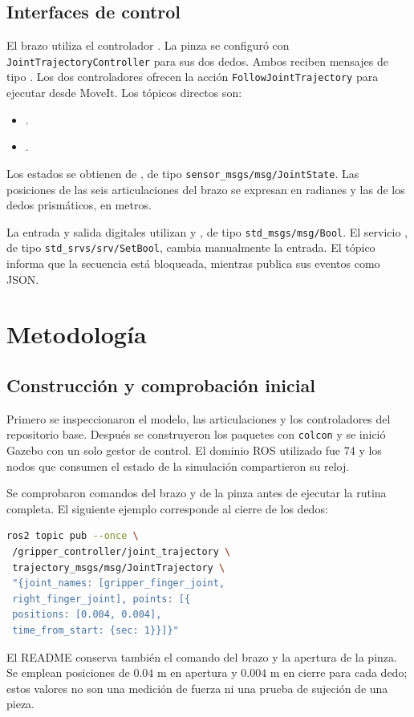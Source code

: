 \documentclass[conference]{IEEEtran}
\begin{document}
\subsection{Interfaces de control}
El brazo utiliza el controlador
. La pinza se configuró con
\texttt{JointTrajectoryController} para sus dos dedos. Ambos reciben mensajes de tipo
.
Los dos controladores ofrecen la acción
\texttt{FollowJointTrajectory} para ejecutar desde MoveIt.
Los tópicos directos son:
\begin{itemize}
\item {}.
\item {}.
\end{itemize}
Los estados se obtienen de , de tipo
\texttt{sensor\_msgs/msg/JointState}. Las posiciones de las seis
articulaciones del brazo se expresan en radianes y las de los dedos
prismáticos, en metros.

La entrada y salida digitales utilizan
 y , de tipo
\texttt{std\_msgs/msg/Bool}. El servicio
, de tipo
\texttt{std\_srvs/srv/SetBool}, cambia manualmente la entrada.
El tópico  informa que la secuencia está
bloqueada, mientras  publica sus eventos como JSON.

\section{Metodología}
\subsection{Construcción y comprobación inicial}
Primero se inspeccionaron el modelo, las articulaciones y los
controladores del repositorio base. Después se construyeron los paquetes
con \texttt{colcon} y se inició Gazebo con un solo gestor de control.
El dominio ROS utilizado fue 74 y los nodos que consumen el estado de
la simulación compartieron su reloj.

Se comprobaron comandos del brazo y de la pinza antes de ejecutar la
rutina completa. El siguiente ejemplo corresponde al cierre de los dedos:
\begin{lstlisting}[language=bash,caption={Comando directo de cierre de la pinza.}]
ros2 topic pub --once \
 /gripper_controller/joint_trajectory \
 trajectory_msgs/msg/JointTrajectory \
 "{joint_names: [gripper_finger_joint,
 right_finger_joint], points: [{
 positions: [0.004, 0.004],
 time_from_start: {sec: 1}}]}"
\end{lstlisting}
El README conserva también el comando del brazo y la apertura de la
pinza. Se emplean posiciones de $0.04$ m en apertura y $0.004$ m
en cierre para cada dedo; estos valores no son una medición de fuerza
ni una prueba de sujeción de una pieza.
\end{document}
